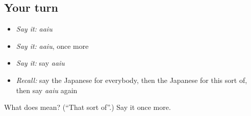 \subsection*{Your turn}
\begin{itemize}
\raggedright
  \item \emph{Say it:} \emph{aaiu}
  \item \emph{Say it:} \emph{aaiu}, once more
  \item \emph{Say it:} say \emph{aaiu}
  \item \emph{Recall:} say the Japanese for everybody, then the Japanese for this sort of, then say \emph{aaiu} again
\end{itemize}

\begin{tcolorbox}[breakable,colback=teal!4,colframe=teal!35!black,title={Before you move on}]
What does  mean? (\textquotedblleft{}That sort of\textquotedblright{}.) Say it once more.
\end{tcolorbox}
